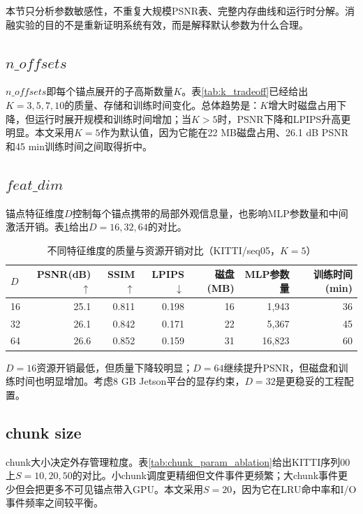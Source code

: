 本节只分析参数敏感性，不重复大规模PSNR表、完整内存曲线和运行时分解。消融实验的目的不是重新证明系统有效，而是解释默认参数为什么合理。

\subsection{\texorpdfstring{$n\_offsets$}{n\_offsets}}

$n\_offsets$即每个锚点展开的子高斯数量$K$。表\ref{tab:k_tradeoff}已经给出$K=3,5,7,10$的质量、存储和训练时间变化。总体趋势是：$K$增大时磁盘占用下降，但运行时展开规模和训练时间增加；当$K>5$时，PSNR下降和LPIPS升高更明显。本文采用$K=5$作为默认值，因为它能在22 MB磁盘占用、26.1 dB PSNR和45 min训练时间之间取得折中。

\subsection{\texorpdfstring{$feat\_dim$}{feat\_dim}}

锚点特征维度$D$控制每个锚点携带的局部外观信息量，也影响MLP参数量和中间激活开销。表\ref{tab:d_ablation}给出$D=16,32,64$的对比。

\begin{table}[htbp]
\centering
\caption{不同特征维度的质量与资源开销对比（KITTI/seq05，$K=5$）}
\label{tab:d_ablation}
\small
\setlength{\tabcolsep}{3pt}
\begin{tabular}{lrrrrrr}
\toprule
\textbf{$D$} & \textbf{PSNR(dB)$\uparrow$} & \textbf{SSIM$\uparrow$} & \textbf{LPIPS$\downarrow$} & \textbf{磁盘(MB)} & \textbf{MLP参数量} & \textbf{训练时间(min)} \\
\midrule
16 & 25.1 & 0.811 & 0.198 & 16 & 1,943 & 36 \\
32 & 26.1 & 0.842 & 0.171 & 22 & 5,367 & 45 \\
64 & 26.6 & 0.852 & 0.159 & 31 & 16,823 & 60 \\
\bottomrule
\end{tabular}
\end{table}

$D=16$资源开销最低，但质量下降较明显；$D=64$继续提升PSNR，但磁盘和训练时间也明显增加。考虑8 GB Jetson平台的显存约束，$D=32$是更稳妥的工程配置。

\subsection{chunk size}

chunk大小决定外存管理粒度。表\ref{tab:chunk_param_ablation}给出KITTI序列00上$S=10,20,50$的对比。小chunk调度更精细但文件事件更频繁；大chunk事件更少但会把更多不可见锚点带入GPU。本文采用$S=20$，因为它在LRU命中率和I/O事件频率之间较平衡。

